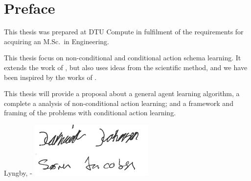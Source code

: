 \chapter{Preface}

This thesis was prepared at DTU Compute in fulfilment of the requirements for acquiring an M.Sc.\ in Engineering.

This thesis focus on non-conditional and conditional action schema learning.
It extends the work of \cite{Walsh2008}, but also uses ideas from the scientific method, and we have been inspired by the works of \cite{popper1959a}.

This thesis will provide a proposal about a general agent learning algorithm, a complete a analysis of non-conditional action learning; and a framework and framing of the problems with conditional action learning. 
\vspace{20mm}
\begin{center}
    \hspace{20mm} Lyngby, \thesishandin-\thesisyear
    \vspace{5mm}
    \newline
    \includegraphics[scale=0.8]{Graphics/signatures}
\end{center}
\begin{flushright}
    \thesisauthor
\end{flushright}
